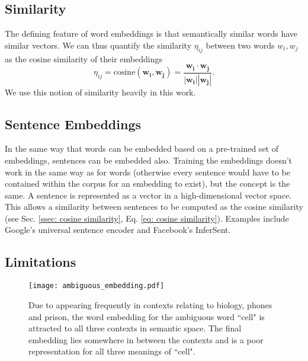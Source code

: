     \subsection{Similarity \label{ssec: cosine similarity}} 
        The defining feature of word \glspl{embedding} is that semantically similar words have similar vectors. We can thus quantify the similarity $\eta_{ij}$ between two words $w_i, w_j$ as the cosine similarity of their \glspl{embedding}
        \begin{equation}
            \eta_{ij} = \text{cosine}(\mathbf{w_i}, \mathbf{w_j}) = \frac{\mathbf{w_i} \cdot \mathbf{w_j}}{|\mathbf{w_i}| |\mathbf{w_j}|}.
            \label{eq: cosine similarity}
        \end{equation}
        We use this notion of similarity heavily in this work.
    
    \subsection{Sentence Embeddings \label{ssec: utterance embeddings}}
    
    In the same way that words can be embedded based on a pre-trained set of \glspl{embedding}, sentences can be embedded also. Training the \glspl{embedding} doesn't work in the same way as for words (otherwise every sentence would have to be contained within the corpus for an embedding to exist), but the concept is the same. A sentence is represented as a vector in a high-dimensional vector space. This allows a similarity between sentences to be computed as the cosine similarity (see Sec. \ref{ssec: cosine similarity}, Eq. \ref{eq: cosine similarity}). Examples include Google's universal sentence encoder\cite{GoogleEncoder} and Facebook's InferSent\cite{infersent}.
     
    \subsection{Limitations}
        \begin{figure}[h]
            \centering
            \texttt{[image: ambiguous\_embedding.pdf]}
            \caption{Due to appearing frequently in contexts relating to biology, phones and prison, the word \gls{embedding} for the ambiguous word ``cell" is attracted to all three contexts in semantic space. The final \gls{embedding} lies somewhere in between the contexts and is a poor representation for all three meanings of ``cell".}
            \label{fig:ambiguous_embedding}
        \end{figure}
        
